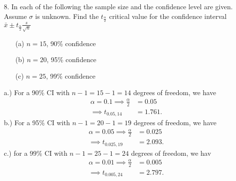 \documentclass{report}
\begin{document}
\pagebreak \bigbreak \noindent 
\begin{mdframed}
8. In each of the following the sample size and the confidence level are given. Assume $\sigma$ is unknown. Find the $t_{\frac{\alpha}{2}}$ critical value for the confidence interval $\bar{x} \pm t_{\frac{\alpha}{2}} \frac{s}{\sqrt{n}}$
\begin{itemize}
    \item[(a)] $n = 15$, 90\% confidence
    \item[(b)] $n = 20$, 95\% confidence
    \item[(c)] $n = 25$, 99\% confidence
\end{itemize}
\end{mdframed}
\bigbreak \noindent 
a.) For a 90\% CI with $n-1 = 15 -1 = 14$ degrees of freedom, we have
\begin{align*}
    \alpha = 0.1 \implies \frac{\alpha}{2} &= 0.05  \\
    \implies t_{0.05,14} &= 1.761
.\end{align*}
\bigbreak \noindent 
b.) For a 95\% CI with $n-1 = 20-1 = 19 $ degrees of freedom, we have
\begin{align*}
    \alpha = 0.05 \implies \frac{\alpha}{2} &= 0.025 \\
    \implies t_{0.025,19} &= 2.093
.\end{align*}
\bigbreak \noindent 
c.) for a 99\% CI  with $n-1 = 25-1 =24$ degrees of freedom, we hav
\begin{align*}
    \alpha = 0.01 \implies \frac{\alpha}{2} &= 0.005 \\
    \implies t_{0.005,24} &= 2.797
.\end{align*}
\end{document}
